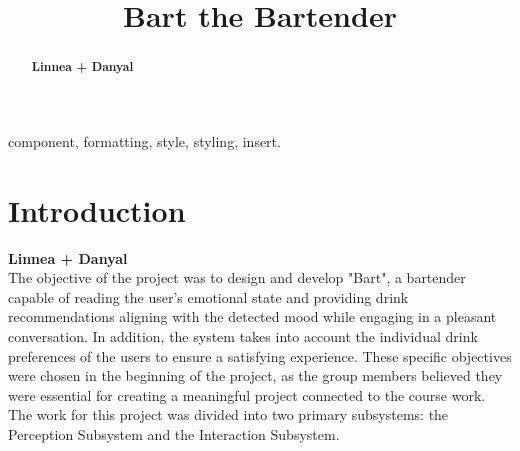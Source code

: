 \documentclass[conference]{IEEEtran}
\begin{document}
\title{Bart the Bartender}

\author{
\and
{}

\and
{}
\and
{}

}

\maketitle


\begin{abstract}
\textbf{Linnea + Danyal}
\end{abstract}

\begin{IEEEkeywords}
component, formatting, style, styling, insert.
\end{IEEEkeywords}

\section{Introduction}
\textbf{Linnea + Danyal}\\
The objective of the project was to design and develop "Bart", a bartender capable of reading the user's emotional state and providing drink recommendations aligning with the detected mood while engaging in a pleasant conversation. In addition, the system takes into account the individual drink preferences of the users to ensure a satisfying experience. These specific objectives were chosen in the beginning of the project, as the group members believed they were essential for creating a meaningful project connected to the course work. 
The work for this project was divided into two primary subsystems: the Perception Subsystem and the Interaction Subsystem. 
\end{document}
